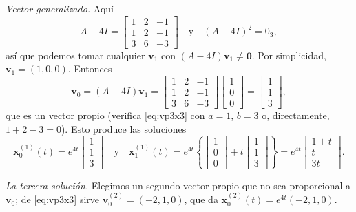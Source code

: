 \begin{example}
\emph{Vector generalizado.} Aqu\'i
\[
A - 4I = \begin{bmatrix} 1 & 2 & -1 \\ 1 & 2 & -1 \\ 3 & 6 & -3 \end{bmatrix} \quad \text{y} \quad (A - 4I)^2 = 0_3,
\]
as\'i que podemos tomar cualquier $\mathbf v_1$ con $(A-4I)\mathbf v_1\neq\mathbf 0$. Por simplicidad, $\mathbf{v}_1 = (1, 0, 0)$. Entonces
\[
\mathbf{v}_0 = (A-4I)\mathbf v_1 = \begin{bmatrix} 1 & 2 & -1 \\ 1 & 2 & -1 \\ 3 & 6 & -3 \end{bmatrix} \begin{bmatrix} 1 \\ 0 \\ 0 \end{bmatrix} = \begin{bmatrix} 1 \\ 1 \\ 3 \end{bmatrix},
\]
que es un vector propio (verifica \eqref{eq:vp3x3} con $a=1$, $b=3$ o, directamente, $1+2-3=0$). Esto produce las soluciones
\[
\mathbf{x}_0^{(1)}(t) = e^{4t} \begin{bmatrix} 1 \\ 1 \\ 3 \end{bmatrix} \quad \text{y} \quad \mathbf{x}_1^{(1)}(t) = e^{4t} \left\{ \begin{bmatrix} 1 \\ 0 \\ 0 \end{bmatrix} + t \begin{bmatrix} 1 \\ 1 \\ 3 \end{bmatrix} \right\} = e^{4t} \begin{bmatrix} 1 + t \\ t \\ 3t \end{bmatrix}.
\]

\emph{La tercera soluci\'on.} Elegimos un segundo vector propio que no sea proporcional a $\mathbf v_0$; de \eqref{eq:vp3x3} sirve $\mathbf{v}_0^{(2)} = (-2, 1, 0)$, que da $\mathbf{x}_0^{(2)}(t) = e^{4t}(-2,1,0)$.


\end{example}
